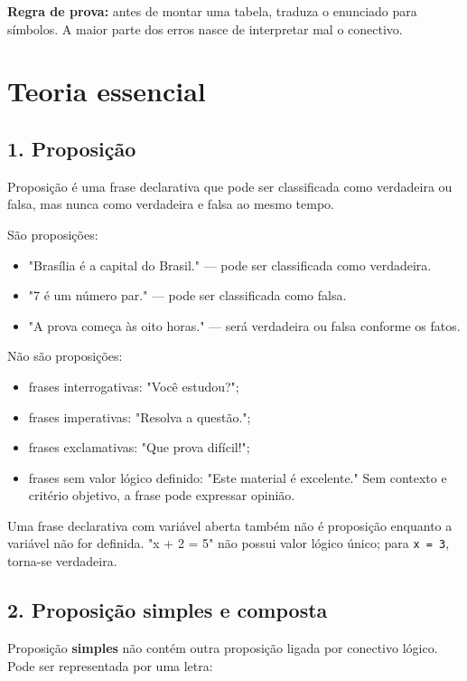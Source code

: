 \documentclass[11pt,a4paper]{article}
\begin{document}
\textbf{Regra de prova:} antes de montar uma tabela, traduza o enunciado para símbolos. A maior parte dos erros nasce de interpretar mal o conectivo.

\section*{Teoria essencial}

\subsection*{1. Proposição}

Proposição é uma frase declarativa que pode ser classificada como verdadeira ou falsa, mas nunca como verdadeira e falsa ao mesmo tempo.

São proposições:

\begin{itemize}
  \item "Brasília é a capital do Brasil." — pode ser classificada como verdadeira.
  \item "7 é um número par." — pode ser classificada como falsa.
  \item "A prova começa às oito horas." — será verdadeira ou falsa conforme os fatos.
\end{itemize}

Não são proposições:

\begin{itemize}
  \item frases interrogativas: "Você estudou?";
  \item frases imperativas: "Resolva a questão.";
  \item frases exclamativas: "Que prova difícil!";
  \item frases sem valor lógico definido: "Este material é excelente." Sem contexto e critério objetivo, a frase pode expressar opinião.
\end{itemize}

Uma frase declarativa com variável aberta também não é proposição enquanto a variável não for definida. "x + 2 = 5" não possui valor lógico único; para \texttt{x = 3}, torna-se verdadeira.

\subsection*{2. Proposição simples e composta}

Proposição \textbf{simples} não contém outra proposição ligada por conectivo lógico. Pode ser representada por uma letra:
\end{document}
